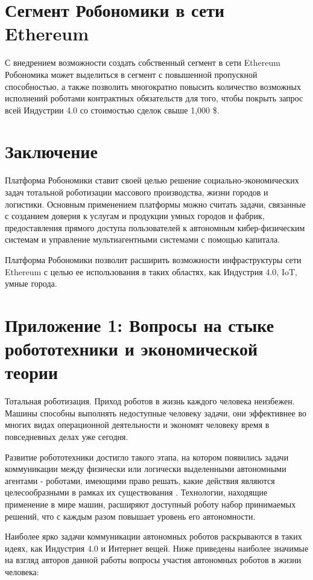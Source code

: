 \documentclass{article}
\begin{document}
\section{Сегмент Робономики в сети Ethereum}

С внедрением возможности создать собственный сегмент в сети Ethereum Робономика может выделиться в сегмент с повышенной пропускной способностью, а также позволить многократно повысить количество возможных исполнений роботами контрактных обязательств для того, чтобы покрыть запрос всей Индустрии 4.0 со стоимостью сделок свыше 1,000 \$.

\section{Заключение}

Платформа Робономики ставит своей целью решение социально-экономических задач тотальной роботизации массового производства, жизни городов и логистики. Основным применением платформы можно считать задачи, связанные с созданием доверия к услугам и продукции умных городов и фабрик, предоставления прямого доступа пользователей к автономным кибер-физическим системам и управление мультиагентными системами с помощью капитала. 

Платформа Робономики позволит расширить возможности инфраструктуры сети Ethereum с целью ее использования в таких областях, как Индустрия 4.0, IoT, умные города.
\newpage
\printbibliography
\newpage
\section*{Приложение 1: Вопросы на стыке робототехники и экономической теории}

Тотальная роботизация. Приход роботов в жизнь каждого человека неизбежен. Машины способны выполнять недоступные человеку задачи, они эффективнее во многих видах операционной деятельности и экономят человеку время в повседневных делах уже сегодня.

Развитие робототехники достигло такого этапа, на котором появились задачи коммуникации между физически или логически выделенными автономными агентами - роботами, имеющими право решать, какие действия являются целесообразными в рамках их существования \cite{Kapitonov2017Blockchain-basedUAVs}. Технологии, находящие применение в мире машин, расширяют доступный роботу набор принимаемых решений, что с каждым разом повышает уровень его автономности.

Наиболее ярко задачи коммуникации автономных роботов раскрываются в таких идеях, как Индустрия 4.0 и Интернет вещей. Ниже приведены наиболее значимые на взгляд авторов данной работы вопросы участия автономных роботов в жизни человека:    
\end{document}
